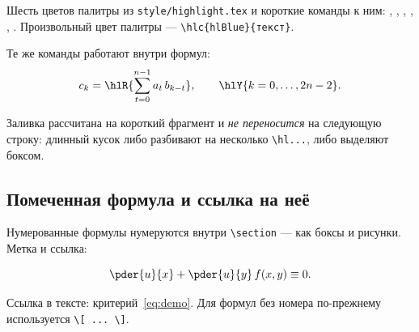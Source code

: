 Шесть цветов палитры из \texttt{style/highlight.tex} и короткие команды к ним:
, , , ,
, . Произвольный цвет палитры ---
\verb|\hlc{hlBlue}{текст}|.

Те же команды работают внутри формул:
\[
c_k = \hlR{\sum_{t=0}^{n-1} a_t\, b_{k-t}}, \qquad
\hlY{k = 0,\dots,2n-2}.
\]

Заливка рассчитана на короткий фрагмент и \emph{не переносится} на следующую
строку: длинный кусок либо разбивают на несколько \verb|\hl...|, либо
выделяют боксом.

\subsection{Помеченная формула и ссылка на неё}

Нумерованные формулы нумеруются внутри \verb|\section| --- как боксы и
рисунки. Метка и ссылка:

\begin{equation}\label{eq:demo}
	\pder{u}{x} + \pder{u}{y}\, f(x,y) \equiv 0 .
\end{equation}

Ссылка в тексте: критерий~\eqref{eq:demo}. Для формул без номера
по-прежнему используется \verb|\[ ... \]|.
